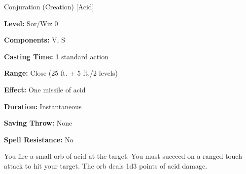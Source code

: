 
Conjuration (Creation) [Acid]

\textbf{Level:} Sor/Wiz 0

\textbf{Components:} V, S

\textbf{Casting Time:} 1 standard action

\textbf{Range:} Close (25 ft. + 5 ft./2 levels)

\textbf{Effect:} One missile of acid

\textbf{Duration:} Instantaneous

\textbf{Saving Throw:} None

\textbf{Spell Resistance:} No

You fire a small orb of acid at the target. You must succeed on a ranged touch 
attack to hit your target. The orb deals 1d3 points of acid damage.

